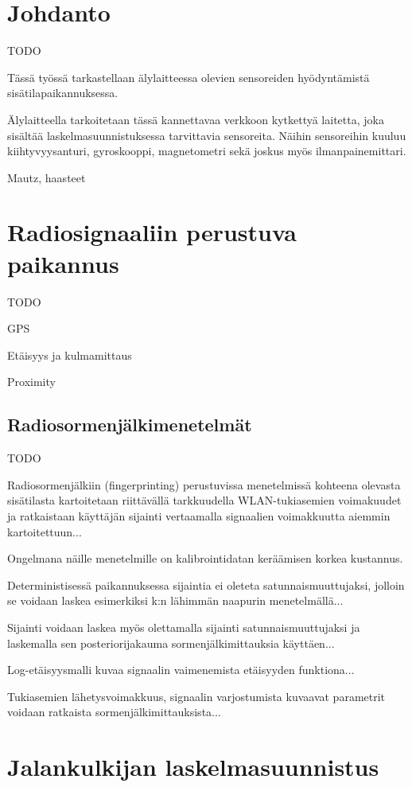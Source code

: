 \section{Johdanto}

TODO

Tässä työssä tarkastellaan älylaitteessa olevien sensoreiden hyödyntämistä
sisätilapaikannuksessa.

Älylaitteella tarkoitetaan tässä kannettavaa verkkoon kytkettyä laitetta, joka
sisältää laskelmasuunnistuksessa tarvittavia sensoreita. Näihin sensoreihin
kuuluu kiihtyvyysanturi, gyroskooppi, magnetometri sekä joskus myös
ilmanpainemittari.

Mautz, haasteet \cite{mautz2012}

\section{Radiosignaaliin perustuva paikannus}

TODO

GPS

Etäisyys ja kulmamittaus

Proximity

\subsection{Radiosormenjälkimenetelmät}

TODO

Radiosormenjälkiin (fingerprinting) perustuvissa menetelmissä kohteena olevasta
sisätilasta kartoitetaan riittävällä tarkkuudella WLAN-tukiasemien voimakuudet
ja ratkaistaan käyttäjän sijainti vertaamalla signaalien voimakkuutta
aiemmin kartoitettuun...

Ongelmana näille menetelmille on kalibrointidatan keräämisen korkea kustannus.

Deterministisessä paikannuksessa sijaintia ei oleteta satunnaismuuttujaksi,
jolloin se voidaan laskea esimerkiksi k:n lähimmän naapurin menetelmällä...

Sijainti voidaan laskea myös olettamalla sijainti satunnaismuuttujaksi
ja laskemalla sen posteriorijakauma sormenjälkimittauksia käyttäen...

Log-etäisyysmalli kuvaa signaalin vaimenemista etäisyyden funktiona...

Tukiasemien lähetysvoimakkuus, signaalin varjostumista kuvaavat parametrit
voidaan ratkaista sormenjälkimittauksista...

\section{Jalankulkijan laskelmasuunnistus}

